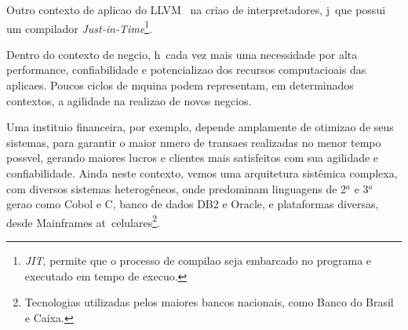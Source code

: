 Outro contexto de aplica\ca o do LLVM \eh\ na cria\ca o de interpretadores, j\ah\ que possui um compilador \emph{Just-in-Time}\footnote{\emph{JIT}, permite que o processo de compila\ca o seja embarcado no programa e executado em tempo de execu\ca o.}.

Dentro do contexto de neg\oh cio, h\ah\ cada vez mais uma necessidade por alta performance, confiabilidade e potencializa\ca o dos recursos computacioais das aplica\co es. Poucos ciclos de m\ah quina podem representam, em determinados contextos, a agilidade na realiza\ca o de novos neg\oh cios.

Uma institui\ca o financeira, por exemplo, depende amplamente de otimiza\ca o de seus sistemas, para garantir o maior n\uh mero de transa\co es realizadas no menor tempo poss\ih vel, gerando maiores lucros e clientes mais satisfeitos com sua agilidade e confiabilidade. Ainda neste contexto, vemos uma arquitetura sist\^emica complexa, com diversos sistemas heterog\^eneos, onde predominam linguagens de 2$^{a}$ e 3$^{a}$ gera\ca o como Cobol e C, banco de dados DB2 e Oracle, e plataformas diversas, desde Mainframes at\eh\ celulares\footnote{Tecnologias utilizadas pelos maiores bancos nacionais, como Banco do Brasil e Caixa.}.
